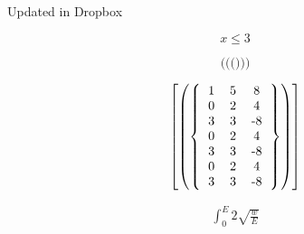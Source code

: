 \documentclass{article}
\begin{document}


Updated in Dropbox

\[ x \le 3 \]

\[
\big(
\Big(
\Bigg(
\big)
\Big)
\Bigg)
\]

\[ 
\left [
\left (
\left \{
  \begin{tabular}{ccc}
  1 & 5 & 8 \\
  0 & 2 & 4 \\
  3 & 3 & -8 \\
  0 & 2 & 4 \\
  3 & 3 & -8 \\
  0 & 2 & 4 \\
  3 & 3 & -8 
  \end{tabular}
\right \}
\right )
\right ]
\]

\begin{align} 
    \int_0^E 2 \sqrt{ \frac{w}{E} } 
\end{align}
\end{document}
